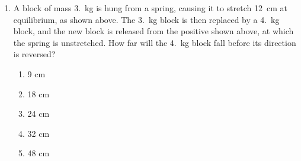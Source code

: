 \documentclass[11pt]{article}
\newcommand{\pic}[2]{\texttt{[image: \#2]}}
\begin{document}
\begin{multicols}{2}
\begin{enumerate}[leftmargin=18pt,resume]
    \begin{center}
      \pic{.24}{two-masses}
    \end{center}
  \item\vspace{-.2in} A block of mass \SI{3.}{\kilo\gram} is hung from a
    spring, causing it to stretch \SI{12}{\centi\metre} at equilibrium, as
    shown above. The \SI{3.}{\kilo\gram} block is then replaced by a
    \SI{4.}{\kilo\gram} block, and the new block is released from the positive
    shown above, at which the spring is unstretched. How far will the
    \SI{4.}{\kilo\gram} block fall before its direction is reversed?
    \begin{enumerate}[nosep,leftmargin=18pt,label=(\Alph*)]
    \item 9 cm
    \item 18 cm
    \item 24 cm
    \item 32 cm
    \item 48 cm
    \end{enumerate}
    
    

\end{enumerate}
\end{multicols}
\end{document}
